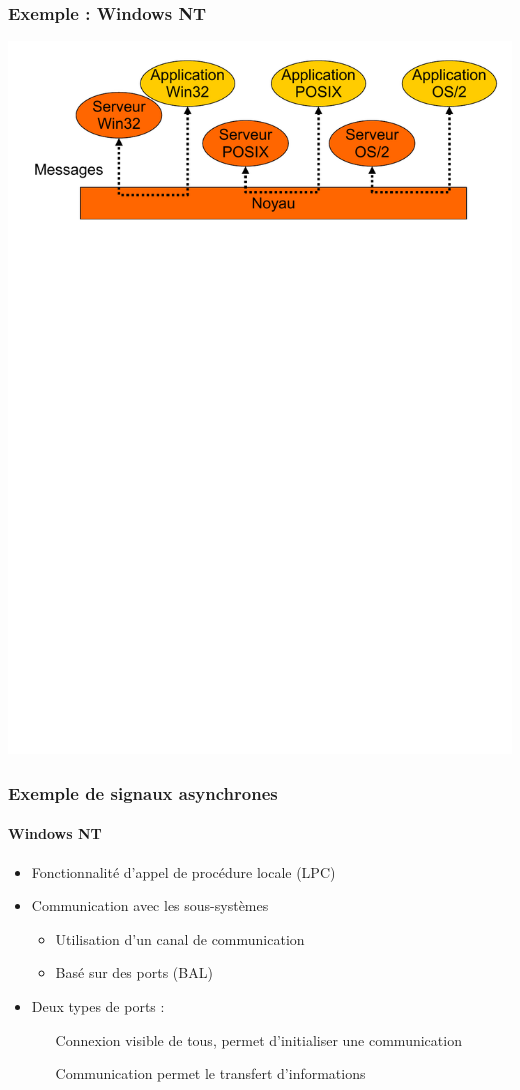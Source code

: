\begin{frame}
\frametitle{Exemple : Windows NT}
\includegraphics[width=.9\textwidth]{../illustration/exemple_winnt.pdf}
\end{frame}

\begin{frame}
\frametitle{Exemple de signaux asynchrones}
\framesubtitle{Windows NT}
\begin{itemize}
\item <1->Fonctionnalité d’appel de procédure locale (LPC)
\item <2->Communication avec les sous-systèmes
\begin{itemize}
\item Utilisation d’un canal de communication
\item Basé sur des ports (BAL)
\end{itemize}
\item <3->Deux types de ports :
\begin{itemize}
\item [Connexion] visible de tous, permet d’initialiser une communication
\item [Communication] permet le transfert d’informations
\end{itemize}
\end{itemize}
\end{frame}

